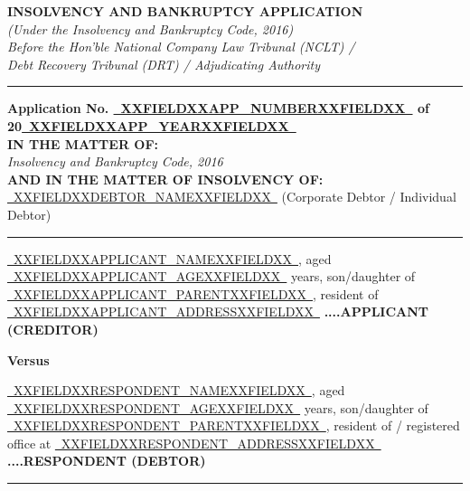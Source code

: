\documentclass[12pt,a4paper]{article}
\newcommand{\fillline}[1]{\underline{~#1~}}
\begin{document}
\begin{center}
    {\LARGE\textbf{INSOLVENCY AND BANKRUPTCY APPLICATION}}\\[0.5em]
    {\normalsize\textit{(Under the Insolvency and Bankruptcy Code, 2016)}}\\[0.3em]
    {\normalsize\textit{Before the Hon'ble National Company Law Tribunal (NCLT) /}}\\
    {\normalsize\textit{Debt Recovery Tribunal (DRT) / Adjudicating Authority}}\\[0.5em]
    \rule{\linewidth}{0.4pt}
\end{center}

\vspace{0.5em}

\begin{center}
    \textbf{Application No. \fillline{XXFIELDXXAPP_NUMBERXXFIELDXX} of 20\fillline{XXFIELDXXAPP_YEARXXFIELDXX}}\\[0.5em]
    \textbf{IN THE MATTER OF:}\\[0.3em]
    \textit{Insolvency and Bankruptcy Code, 2016}\\[0.3em]
    \textbf{AND IN THE MATTER OF INSOLVENCY OF:}\\[0.3em]
    \fillline{XXFIELDXXDEBTOR_NAMEXXFIELDXX} (Corporate Debtor / Individual Debtor)
\end{center}

\vspace{1em}
\rule{\linewidth}{0.4pt}
\vspace{1em}

\noindent \fillline{XXFIELDXXAPPLICANT_NAMEXXFIELDXX}, aged \fillline{XXFIELDXXAPPLICANT_AGEXXFIELDXX} years,
son/daughter of \fillline{XXFIELDXXAPPLICANT_PARENTXXFIELDXX},
resident of \fillline{XXFIELDXXAPPLICANT_ADDRESSXXFIELDXX}
\hfill\textbf{....APPLICANT (CREDITOR)}

\vspace{1em}
\begin{center}\textbf{Versus}\end{center}
\vspace{1em}

\noindent \fillline{XXFIELDXXRESPONDENT_NAMEXXFIELDXX}, aged \fillline{XXFIELDXXRESPONDENT_AGEXXFIELDXX} years,
son/daughter of \fillline{XXFIELDXXRESPONDENT_PARENTXXFIELDXX},
resident of / registered office at \fillline{XXFIELDXXRESPONDENT_ADDRESSXXFIELDXX}
\hfill\textbf{....RESPONDENT (DEBTOR)}

\vspace{1em}
\rule{\linewidth}{0.4pt}
\end{document}
